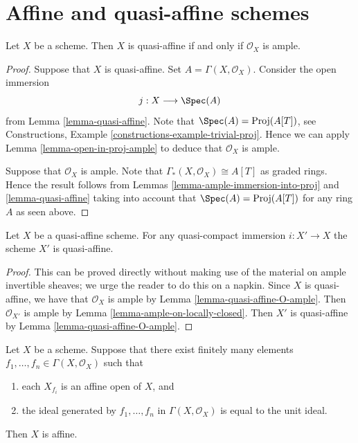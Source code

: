 \section{Affine and quasi-affine schemes}
\label{section-affine-quasi-affine}

\begin{lemma}
\label{lemma-quasi-affine-O-ample}
Let $X$ be a scheme.
Then $X$ is quasi-affine if and only if $\mathcal{O}_X$ is ample.
\end{lemma}

\begin{proof}
Suppose that $X$ is quasi-affine. Set $A = \Gamma(X, \mathcal{O}_X)$.
Consider the open immersion
$$
j : X \longrightarrow \Spec(A)
$$
from Lemma \ref{lemma-quasi-affine}. Note that
$\Spec(A) = \text{Proj}(A[T])$, see
Constructions, Example \ref{constructions-example-trivial-proj}.
Hence we can apply Lemma \ref{lemma-open-in-proj-ample}
to deduce that $\mathcal{O}_X$ is ample.

\medskip\noindent
Suppose that $\mathcal{O}_X$ is ample.
Note that $\Gamma_*(X, \mathcal{O}_X) \cong A[T]$
as graded rings. Hence the result follows from Lemmas
\ref{lemma-ample-immersion-into-proj} and \ref{lemma-quasi-affine}
taking into account that
$\Spec(A) = \text{Proj}(A[T])$ for any ring $A$
as seen above.
\end{proof}

\begin{lemma}
\label{lemma-quasi-affine-locally-closed}
Let $X$ be a quasi-affine scheme. For any quasi-compact immersion
$i : X' \to X$ the scheme $X'$ is quasi-affine.
\end{lemma}

\begin{proof}
This can be proved directly without making use of the material on
ample invertible sheaves; we urge the reader to do this on a napkin.
Since $X$ is quasi-affine, we have that $\mathcal{O}_X$ is ample by
Lemma \ref{lemma-quasi-affine-O-ample}.
Then $\mathcal{O}_{X'}$ is ample by
Lemma \ref{lemma-ample-on-locally-closed}. Then $X'$ is quasi-affine by
Lemma \ref{lemma-quasi-affine-O-ample}.
\end{proof}

\begin{lemma}
\label{lemma-characterize-affine}
Let $X$ be a scheme. Suppose that there exist finitely many elements
$f_1, \ldots, f_n \in \Gamma(X, \mathcal{O}_X)$ such that
\begin{enumerate}
\item each $X_{f_i}$ is an affine open of $X$, and
\item the ideal generated by $f_1, \ldots, f_n$ in
$\Gamma(X, \mathcal{O}_X)$ is equal to the unit ideal.
\end{enumerate}
Then $X$ is affine.
\end{lemma}

